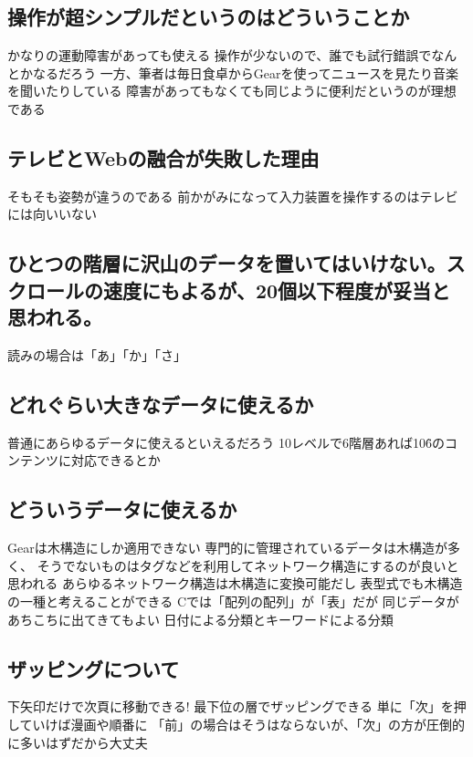 \documentclass[twoside]{wiss}
\begin{document}
\subsection*{操作が超シンプルだというのはどういうことか}

  かなりの運動障害があっても使える
  操作が少ないので、誰でも試行錯誤でなんとかなるだろう
  一方、筆者は毎日食卓からGearを使ってニュースを見たり音楽を聞いたりしている
  障害があってもなくても同じように便利だというのが理想である

\subsection*{テレビとWebの融合が失敗した理由}
   そもそも姿勢が違うのである
   前かがみになって入力装置を操作するのはテレビには向いいない

\subsection*{ひとつの階層に沢山のデータを置いてはいけない。スクロールの速度にもよるが、20個以下程度が妥当と思われる。}
   読みの場合は「あ」「か」「さ」

\subsection*{どれぐらい大きなデータに使えるか}

   普通にあらゆるデータに使えるといえるだろう
   10レベルで6階層あれば10\^6のコンテンツに対応できるとか

\subsection*{どういうデータに使えるか}
   Gearは木構造にしか適用できない
   専門的に管理されているデータは木構造が多く、
   そうでないものはタグなどを利用してネットワーク構造にするのが良いと思われる
   あらゆるネットワーク構造は木構造に変換可能だし
     表型式でも木構造の一種と考えることができる
     Cでは「配列の配列」が「表」だが
   同じデータがあちこちに出てきてもよい
     日付による分類とキーワードによる分類

\subsection*{ザッピングについて}
   下矢印だけで次頁に移動できる!
   最下位の層でザッピングできる
   単に「次」を押していけば漫画や順番に
   「前」の場合はそうはならないが、「次」の方が圧倒的に多いはずだから大丈夫
\end{document}
